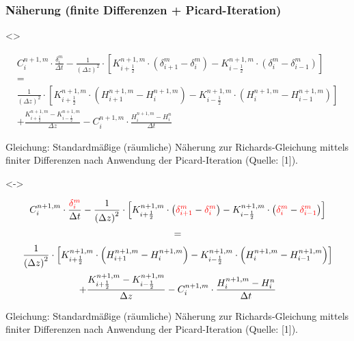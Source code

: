 \documentclass[xcolor=dvipsnames]{beamer}
\newcommand{\mycaption}[1]{\tiny\raggedright{#1}}
\newcounter{firstElement}
\newcounter{secondElement}
\begin{document}
\begin{frame}
  \frametitle{Näherung (finite Differenzen + Picard-Iteration)}
  \only<\thefirstElement>{
    \vspace{-5mm}
    \begin{gather*}
      C_i^{n+1,m} \cdot \frac{\delta_i^m}{\Delta t} - \frac{1}{\left(\Delta z\right)^2} \cdot \left[K_{i+\frac{1}{2}}^{n+1,m} \cdot \left(\delta_{i+1}^m - \delta_i^m\right) - K_{i-\frac{1}{2}}^{n+1,m} \cdot \left(\delta_i^m - \delta_{i-1}^m\right)\right] \\[+0.5mm]
      = \\[+0.5mm]
      \frac{1}{\left(\Delta z\right)^2} \cdot \left[K_{i+\frac{1}{2}}^{n+1,m} \cdot \left(H_{i+1}^{n+1,m} - H_i^{n+1,m}\right) - K_{i-\frac{1}{2}}^{n+1,m} \cdot \left(H_{i}^{n+1,m} - H_{i-1}^{n+1,m}\right)\right] \\[+0.5mm]
      + \frac{K_{i+\frac{1}{2}}^{n+1,m} - K_{i-\frac{1}{2}}^{n+1,m}}{\Delta z} - C_i^{n+1,m} \cdot \frac{H_i^{n+1,m} - H_i^n}{\Delta t}
    \end{gather*}
      \begin{minipage}{1.0\textwidth}
        \mycaption{Gleichung: Standardmäßige (räumliche) Näherung zur Richards-Gleichung mittels finiter Differenzen nach Anwendung der Picard-Iteration (Quelle: [1]).}
      \end{minipage}
    \vspace{-7mm}}
  \only<\thesecondElement->{
    \vspace{-5mm}
    \begin{gather*}
      C_i^{n+1,m} \cdot \frac{\textcolor{red}{\delta_i^m}}{\Delta t} - \frac{1}{\left(\Delta z\right)^2} \cdot \left[K_{i+\frac{1}{2}}^{n+1,m} \cdot \left(\textcolor{red}{\delta_{i+1}^m} - \textcolor{red}{\delta_i^m}\right) - K_{i-\frac{1}{2}}^{n+1,m} \cdot \left(\textcolor{red}{\delta_i^m} - \textcolor{red}{\delta_{i-1}^m}\right)\right] \\[+0.5mm]
      = \\[+0.5mm]
      \frac{1}{\left(\Delta z\right)^2} \cdot \left[K_{i+\frac{1}{2}}^{n+1,m} \cdot \left(H_{i+1}^{n+1,m} - H_i^{n+1,m}\right) - K_{i-\frac{1}{2}}^{n+1,m} \cdot \left(H_{i}^{n+1,m} - H_{i-1}^{n+1,m}\right)\right] \\[+0.5mm]
      + \frac{K_{i+\frac{1}{2}}^{n+1,m} - K_{i-\frac{1}{2}}^{n+1,m}}{\Delta z} - C_i^{n+1,m} \cdot \frac{H_i^{n+1,m} - H_i^n}{\Delta t}
    \end{gather*}
      \begin{minipage}{1.0\textwidth}
        \mycaption{Gleichung: Standardmäßige (räumliche) Näherung zur Richards-Gleichung mittels finiter Differenzen nach Anwendung der Picard-Iteration (Quelle: [1]).}

\end{minipage}}
\end{frame}
\end{document}
